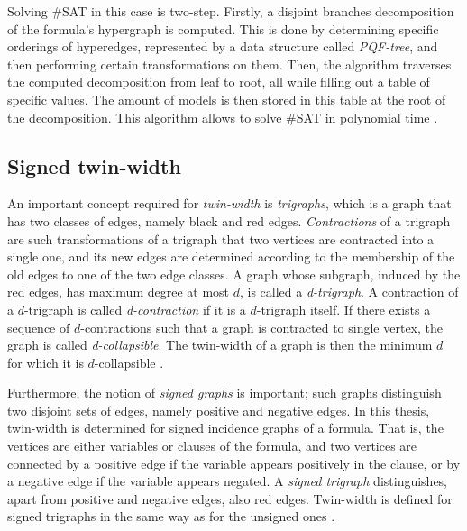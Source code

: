 \documentclass{article}
\begin{document}
Solving \#SAT in this case is two-step. Firstly, a disjoint branches decomposition of the formula's hypergraph is computed.
This is done by determining specific orderings of hyperedges, represented by a data structure called {\em PQF-tree}, and then performing certain transformations on them.
Then, the algorithm traverses the computed decomposition from leaf to root, all while filling out a table of specific values.
The amount of models is then stored in this table at the root of the decomposition.
This algorithm allows to solve \#SAT in polynomial time \cite{DBLP:conf/sat/CapelliDM14}.

\subsection{Signed twin-width}

An important concept required for {\em twin-width} is {\em trigraphs}, which is a graph that has two classes of edges, namely black and red edges.
{\em Contractions} of a trigraph are such transformations of a trigraph that two vertices are contracted into a single one, and its new edges are determined according to the membership of the old edges to one of the two edge classes.
A graph whose subgraph, induced by the red edges, has maximum degree at most $d$, is called a {\em d-trigraph}.
A contraction of a $d$-trigraph is called {\em d-contraction} if it is a $d$-trigraph itself.
If there exists a sequence of $d$-contractions such that a graph is contracted to single vertex, the graph is called {\em d-collapsible}. The twin-width of a graph is then the minimum $d$ for which it is $d$-collapsible \cite{DBLP:conf/sat/GanianPSSS22}.

Furthermore, the notion of {\em signed graphs} is important; such graphs distinguish two disjoint sets of edges, namely positive and negative edges.
In this thesis, twin-width is determined for signed incidence graphs of a formula.
That is, the vertices are either variables or clauses of the formula, and two vertices are connected by a positive edge if the variable appears positively in the clause, or by a negative edge if the variable appears negated.
A {\em signed trigraph} distinguishes, apart from positive and negative edges, also red edges. Twin-width is defined for signed trigraphs in the same way as for the unsigned ones \cite{DBLP:conf/sat/GanianPSSS22}.
\end{document}
